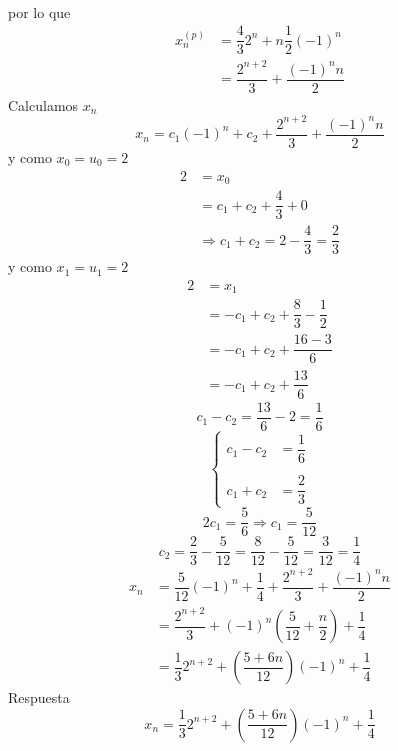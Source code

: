 \begin{ejercicio}
\begin{align*}
    \end{align*}
    por lo que 
    \begin{align*}
        x_n^{(p)} &= \dfrac{4}{3} 2^n + n \dfrac{1}{2} {(-1)}^{n} \\
                  &= \dfrac{2^{n+2}}{3} +\dfrac{{(-1)}^{n}n}{2} 
    \end{align*}
    Calculamos $x_n$
    \begin{equation*}
        x_n = c_1 {(-1)}^{n}+ c_2 + \dfrac{2^{n+2}}{3} + \dfrac{{(-1)}^{n}n}{2} 
    \end{equation*}
    y como $x_0 = u_0 = 2$
    \begin{align*}
        2 &= x_0 \\ 
          &= c_1 + c_2 + \dfrac{4}{3} + 0 \\
          &\Longrightarrow c_1 + c_2 = 2 - \dfrac{4}{3} = \dfrac{2}{3} 
    \end{align*}
    y como $x_1 = u_1 = 2$ 
    \begin{align*}
        2 &= x_1 \\
          &= -c_1 +c_2 + \dfrac{8}{3} - \dfrac{1}{2} \\
          &= -c_1 + c_2 + \dfrac{16-3}{6}  \\
          &= -c_1 + c_2 + \dfrac{13}{6} 
    \end{align*}
    \begin{equation*}
        c_1 - c_2 = \dfrac{13}{6} -2 = \dfrac{1}{6} 
    \end{equation*}
    \begin{equation*}
        \left\{\begin{array}{ll}
            c_1 - c_2 &= \dfrac{1}{6} \\
                      & \\
            c_1 + c_2 &= \dfrac{2}{3} 
    \end{array}\right.
    \end{equation*}
    \begin{equation*}
        2c_1 = \dfrac{5}{6} \Longrightarrow  c_1 = \dfrac{5}{12} 
    \end{equation*}
    \begin{equation*}
        c_2 = \dfrac{2}{3} - \dfrac{5}{12} = \dfrac{8}{12} - \dfrac{5}{12} = \dfrac{3}{12}  = \dfrac{1}{4} 
    \end{equation*}
    \begin{align*}
        x_n &= \dfrac{5}{12} {(-1)}^{n} + \dfrac{1}{4}  + \dfrac{2^{n+2}}{3}  + \dfrac{{(-1)}^{n}n}{2} \\
            &= \dfrac{2^{n+2}}{3} + {(-1)}^{n} \left(\dfrac{5}{12} + \dfrac{n}{2} \right) + \dfrac{1}{4} \\
            &= \dfrac{1}{3} 2^{n+2} + \left(\dfrac{5+6n}{12} \right) {(-1)}^{n} +\dfrac{1}{4} 
    \end{align*}
    Respuesta
    \begin{equation*}
        x_n = \dfrac{1}{3} 2^{n+2} + \left(\dfrac{5+6n}{12} \right) {(-1)}^{n} +\dfrac{1}{4} 
    \end{equation*}
\end{ejercicio}

